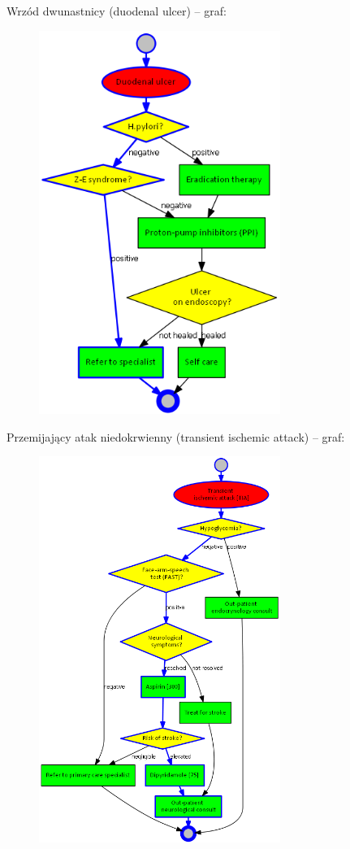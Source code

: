 \documentclass[oneside,a4paper]{book}
\begin{document}
\begin{spacing}{1.5}
Wrzód dwunastnicy (duodenal ulcer) – graf:
\begin{figure}[H]
\centering
\includegraphics[width=0.7\textwidth]{img/du.png}
\end{figure}
\newpage
Przemijający atak niedokrwienny (transient ischemic attack) – graf:
\begin{figure}[H]
\centering
\includegraphics[width=0.7\textwidth]{img/tia.png}

\end{figure}
\end{spacing}
\end{document}
